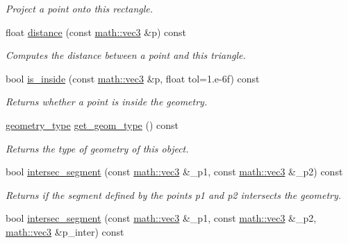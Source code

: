 \begin{DoxyCompactItemize}
\begin{DoxyCompactList}\small\item\em Project a point onto this rectangle. \end{DoxyCompactList}\item 
float \hyperlink{classphysim_1_1geometric_1_1rectangle_a7e80994ff1d2e2be4cdb3f195fc2edef}{distance} (const \hyperlink{structphysim_1_1math_1_1vec3}{math\+::vec3} \&p) const
\begin{DoxyCompactList}\small\item\em Computes the distance between a point and this triangle. \end{DoxyCompactList}\item 
bool \hyperlink{classphysim_1_1geometric_1_1rectangle_ab36400ef3f750fb6482fda8e1044bfa5}{is\+\_\+inside} (const \hyperlink{structphysim_1_1math_1_1vec3}{math\+::vec3} \&p, float tol=1.e-\/6f) const
\begin{DoxyCompactList}\small\item\em Returns whether a point is inside the geometry. \end{DoxyCompactList}\item 
\mbox{\label{classphysim_1_1geometric_1_1rectangle_a0113e292a85b730d82a8fb2f417e1f76}} 
\hyperlink{namespacephysim_1_1geometric_ac2794fff270c5b2ff4307f107a365fca}{geometry\+\_\+type} \hyperlink{classphysim_1_1geometric_1_1rectangle_a0113e292a85b730d82a8fb2f417e1f76}{get\+\_\+geom\+\_\+type} () const
\begin{DoxyCompactList}\small\item\em Returns the type of geometry of this object. \end{DoxyCompactList}\item 
bool \hyperlink{classphysim_1_1geometric_1_1rectangle_aed45b841c7d1e615565e36720386f7a4}{intersec\+\_\+segment} (const \hyperlink{structphysim_1_1math_1_1vec3}{math\+::vec3} \&\+\_\+p1, const \hyperlink{structphysim_1_1math_1_1vec3}{math\+::vec3} \&\+\_\+p2) const
\begin{DoxyCompactList}\small\item\em Returns if the segment defined by the points {\itshape p1} and {\itshape p2} intersects the geometry. \end{DoxyCompactList}\item 
bool \hyperlink{classphysim_1_1geometric_1_1rectangle_a093865345b5a82576351be159ae56ee1}{intersec\+\_\+segment} (const \hyperlink{structphysim_1_1math_1_1vec3}{math\+::vec3} \&\+\_\+p1, const \hyperlink{structphysim_1_1math_1_1vec3}{math\+::vec3} \&\+\_\+p2, \hyperlink{structphysim_1_1math_1_1vec3}{math\+::vec3} \&p\+\_\+inter) const

\end{DoxyCompactItemize}
